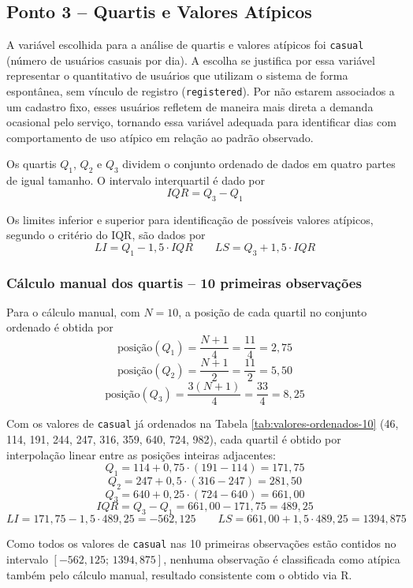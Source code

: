 \documentclass[10pt, a4paper]{article}
\begin{document}
\subsection{Ponto 3 -- Quartis e Valores Atípicos}

A variável escolhida para a análise de quartis e valores atípicos foi \texttt{casual} (número de usuários casuais por dia). A escolha se justifica por essa variável representar o quantitativo de usuários que utilizam o sistema de forma espontânea, sem vínculo de registro (\texttt{registered}). Por não estarem associados a um cadastro fixo, esses usuários refletem de maneira mais direta a demanda ocasional pelo serviço, tornando essa variável adequada para identificar dias com comportamento de uso atípico em relação ao padrão observado.

Os quartis $Q_1$, $Q_2$ e $Q_3$ dividem o conjunto ordenado de dados em quatro partes de igual tamanho. O intervalo interquartil é dado por
\[
IQR = Q_3 - Q_1
\]

Os limites inferior e superior para identificação de possíveis valores atípicos, segundo o critério do IQR, são dados por
\[
LI = Q_1 - 1{,}5 \cdot IQR \qquad LS = Q_3 + 1{,}5 \cdot IQR
\]

\subsubsection{Cálculo manual dos quartis -- 10 primeiras observações}

Para o cálculo manual, com $N = 10$, a posição de cada quartil no conjunto ordenado é obtida por
\[
\text{posição}(Q_1) = \frac{N+1}{4} = \frac{11}{4} = 2{,}75
\]
\[
\text{posição}(Q_2) = \frac{N+1}{2} = \frac{11}{2} = 5{,}50
\]
\[
\text{posição}(Q_3) = \frac{3(N+1)}{4} = \frac{33}{4} = 8{,}25
\]

Com os valores de \texttt{casual} já ordenados na Tabela \ref{tab:valores-ordenados-10} (46, 114, 191, 244, 247, 316, 359, 640, 724, 982), cada quartil é obtido por interpolação linear entre as posições inteiras adjacentes:
\[
Q_1 = 114 + 0{,}75 \cdot (191 - 114) = 171{,}75
\]
\[
Q_2 = 247 + 0{,}5 \cdot (316 - 247) = 281{,}50
\]
\[
Q_3 = 640 + 0{,}25 \cdot (724 - 640) = 661{,}00
\]
\[
IQR = Q_3 - Q_1 = 661{,}00 - 171{,}75 = 489{,}25
\]
\[
LI = 171{,}75 - 1{,}5 \cdot 489{,}25 = -562{,}125 \qquad LS = 661{,}00 + 1{,}5 \cdot 489{,}25 = 1394{,}875
\]

Como todos os valores de \texttt{casual} nas 10 primeiras observações estão contidos no intervalo $[-562{,}125;\,1394{,}875]$, nenhuma observação é classificada como atípica também pelo cálculo manual, resultado consistente com o obtido via R.
\end{document}
